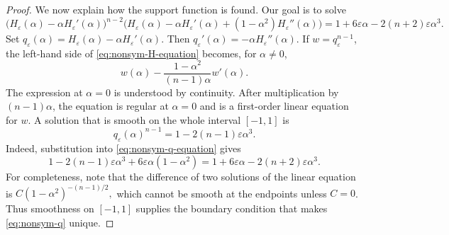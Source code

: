 \documentclass[11pt]{article}
\theoremstyle{remark}
\begin{document}
\begin{proof}
We now explain how the support function is found.  Our goal is to solve
\begin{equation}\label{eq:nonsym-H-equation}
 \bigl(H_\varepsilon(\alpha)-\alpha H_\varepsilon'(\alpha)\bigr)^{n-2}
 \bigl(H_\varepsilon(\alpha)-\alpha H_\varepsilon'(\alpha)
 +(1-\alpha^2)H_\varepsilon''(\alpha)\bigr)
 =1+6\varepsilon\alpha-2(n+2)\varepsilon\alpha^3.
\end{equation}
Set
$
 q_\varepsilon(\alpha)
 =H_\varepsilon(\alpha)-\alpha H_\varepsilon'(\alpha).
$
Then $q_\varepsilon'(\alpha)=-\alpha H_\varepsilon''(\alpha)$.  If
$w=q_\varepsilon^{n-1}$, the left-hand side of
\eqref{eq:nonsym-H-equation} becomes, for $\alpha\ne0$,
\begin{equation}\label{eq:nonsym-q-equation}
 w(\alpha)-\frac{1-\alpha^2}{(n-1)\alpha}w'(\alpha).
\end{equation}
The expression at $\alpha=0$ is understood by continuity.  After
multiplication by $(n-1)\alpha$, the equation is regular at
$\alpha=0$ and is a first-order linear equation for $w$.  A solution that is smooth on the whole interval $[-1,1]$ is
\begin{equation}\label{eq:nonsym-q}
 q_\varepsilon(\alpha)^{n-1}
 =1-2(n-1)\varepsilon\alpha^3.
\end{equation}
Indeed, substitution into \eqref{eq:nonsym-q-equation} gives
\[
 1-2(n-1)\varepsilon\alpha^3
 +6\varepsilon\alpha(1-\alpha^2)
 =1+6\varepsilon\alpha-2(n+2)\varepsilon\alpha^3.
\]
For completeness,  note that the difference of two solutions of the linear equation
is
$
 C(1-\alpha^2)^{-(n-1)/2},
$
which cannot be smooth at the endpoints unless $C=0$.  Thus smoothness on
$[-1,1]$ supplies the boundary condition that makes
\eqref{eq:nonsym-q} unique.


\end{proof}
\end{document}
